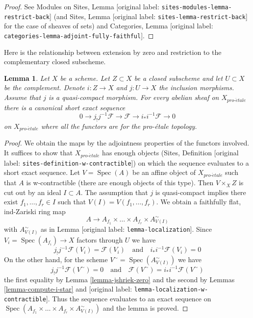 \documentclass[10pt,a4paper]{article}
\theoremstyle{plain}
\newtheorem{lemma}[subsection]{Lemma}
\theoremstyle{definition}
\theoremstyle{remark}
\numberwithin{equation}{subsection}
\def\Spec{\mathop{\mathrm{Spec}}}
\def\proetale{{pro\text{-}\acute{e}tale}}
\begin{document}
\begin{proof}
See Modules on Sites, Lemma [original label: \nolinkurl{sites-modules-lemma-restrict-back}]
(and Sites, Lemma [original label: \nolinkurl{sites-lemma-restrict-back}] for the case
of sheaves of sets) and
Categories, Lemma [original label: \nolinkurl{categories-lemma-adjoint-fully-faithful}].
\end{proof}

\noindent
Here is the relationship between extension by zero and restriction
to the complementary closed subscheme.

\begin{lemma}
\label{lemma-ses-associated-to-open}
Let $X$ be a scheme. Let $Z \subset X$ be a closed subscheme and let
$U \subset X$ be the complement. Denote $i : Z \to X$ and $j : U \to X$
the inclusion morphisms. Assume that $j$ is a quasi-compact morphism.
For every abelian sheaf on $X_\proetale$ there is a canonical short exact
sequence
$$
0 \to j_!j^{-1}\mathcal{F} \to \mathcal{F} \to i_*i^{-1}\mathcal{F} \to 0
$$
on $X_\proetale$ where all the functors are for the pro-\'etale topology.
\end{lemma}

\begin{proof}
We obtain the maps by the adjointness properties of the functors involved.
It suffices to show that $X_\proetale$ has enough objects
(Sites, Definition [original label: \nolinkurl{sites-definition-w-contractible}]) on which
the sequence evaluates to a short exact sequence.
Let $V = \Spec(A)$ be an affine object of $X_\proetale$
such that $A$ is w-contractible (there are enough objects of this type).
Then $V \times_X Z$ is cut out by an ideal $I \subset A$.
The assumption that $j$ is quasi-compact implies there exist
$f_1, \ldots, f_r \in I$ such that $V(I) = V(f_1, \ldots, f_r)$.
We obtain a faithfully flat, ind-Zariski ring map
$$
A \longrightarrow A_{f_1} \times \ldots \times A_{f_r} \times
A_{V(I)}^\sim
$$
with $A_{V(I)}^\sim$ as in Lemma [original label: \nolinkurl{lemma-localization}].
Since $V_i = \Spec(A_{f_i}) \to X$ factors through $U$ we have
$$
j_!j^{-1}\mathcal{F}(V_i) = \mathcal{F}(V_i)
\quad\text{and}\quad
i_*i^{-1}\mathcal{F}(V_i) = 0
$$
On the other hand, for the scheme $V^\sim = \Spec(A_{V(I)}^\sim)$
we have
$$
j_!j^{-1}\mathcal{F}(V^\sim) = 0
\quad\text{and}\quad
\mathcal{F}(V^\sim) = i_*i^{-1}\mathcal{F}(V^\sim)
$$
the first equality by Lemma \ref{lemma-jshriek-zero}
and the second by
Lemmas \ref{lemma-compute-i-star} and [original label: \nolinkurl{lemma-localization-w-contractible}].
Thus the sequence evaluates to an exact sequence on
$\Spec(A_{f_1} \times \ldots \times A_{f_r} \times A_{V(I)}^\sim)$
and the lemma is proved.
\end{proof}
\end{document}
